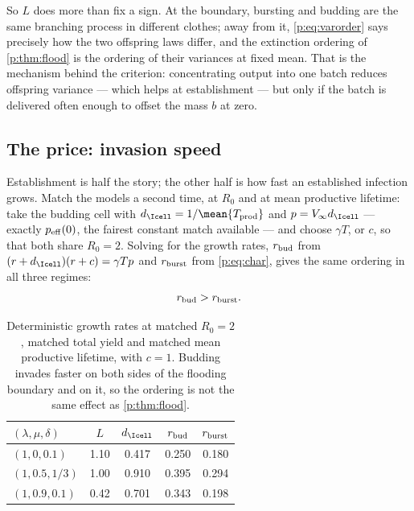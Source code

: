 \noindent
So $L$ does more than fix a sign. At the boundary, bursting and budding are
the same branching process in different clothes; away from it,
\cref{p:eq:varorder} says precisely how the two offspring laws differ, and
the extinction ordering of \cref{p:thm:flood} is the ordering of their
variances at fixed mean. That is the mechanism behind the criterion:
concentrating output into one batch reduces offspring variance --- which
helps at establishment --- but only if the batch is delivered often enough
to offset the mass $b$ at zero.

\subsection{The price: invasion speed}
\label{p:sec:tradeoff}

Establishment is half the story; the other half is how fast an established
infection grows. Match the models a second time, at $R_0$ and at mean
productive lifetime: take the budding cell with
$d_{\Icell}=1/\mean{T_{\rm prod}}$ and $p=V_\infty d_{\Icell}$ --- exactly
$p_{\rm eff}(0)$, the fairest constant match available --- and choose
$\gamma T$, or $c$, so that both share $R_0=2$. Solving for the growth rates,
$r_{\rm bud}$ from $(r+d_{\Icell})(r+c)=\gamma Tp$ and $r_{\rm burst}$ from
\cref{p:eq:char}, gives the same ordering in all three regimes:
\begin{equation}
r_{\rm bud}>r_{\rm burst}.
\label{p:eq:rorder}
\end{equation}

\begin{table}[htbp]
\centering
\renewcommand{\arraystretch}{1.1}
\begin{tabular}{@{}l S[table-format=1.2]
    S[table-format=1.3]S[table-format=1.3]S[table-format=1.3]@{}}
\toprule
{$(\lambda,\mu,\delta)$} & {$L$} & {$d_{\Icell}$}
 & {$r_{\rm bud}$} & {$r_{\rm burst}$} \\
\midrule
$(1,0,0.1)$   & 1.10 & 0.417 & 0.250 & 0.180 \\
$(1,0.5,1/3)$ & 1.00 & 0.910 & 0.395 & 0.294 \\
$(1,0.9,0.1)$ & 0.42 & 0.701 & 0.343 & 0.198 \\
\bottomrule
\end{tabular}
\caption{Deterministic growth rates at matched $R_0=2$, matched total yield
and matched mean productive lifetime, with $c=1$. Budding invades faster on
both sides of the flooding boundary and on it, so the ordering is not the
same effect as \cref{p:thm:flood}.}
\label{p:tab:tradeoff}
\end{table}

